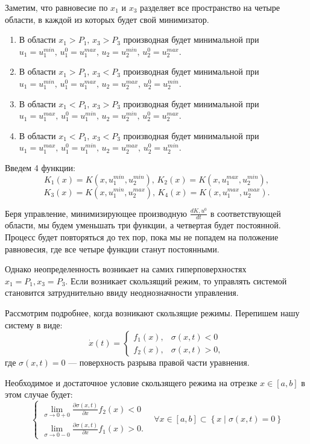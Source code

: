 \documentclass[11pt]{article}
\newcommand\Set[2]{\left\{ #1 \mid #2 \right\}}
\newcommand\dd[2]{\frac{\partial#1}{\partial#2}}
\begin{document}
Заметим, что равновесие по $x_1$ и $x_3$ разделяет все пространство на четыре области, в каждой из которых будет свой минимизатор.
\begin{enumerate}
\item
	В области $x_1 > P_1, \, x_3 > P_3$ производная будет минимальной при $u_1 = u_1^{min}, \, u_1^0 = u_1^{max}, \, u_2 = u_2^{min}, \, u_2^0 = u_2^{max}.$
\item
	В области $x_1 > P_1, \, x_3 < P_3$ производная будет минимальной при $u_1 = u_1^{min}, \, u_1^0 = u_1^{max}, \, u_2 = u_2^{max}, \, u_2^0 = u_2^{min}.$
\item
	В области $x_1 < P_1, \, x_3 > P_3$ производная будет минимальной при $u_1 = u_1^{max}, \, u_1^0 = u_1^{min}, \, u_2 = u_2^{min}, \, u_2^0 = u_2^{max}.$
\item
	В области $x_1 < P_1, \, x_3 < P_3$ производная будет минимальной при $u_1 = u_1^{max}, \, u_1^0 = u_1^{min}, \, u_2 = u_2^{max}, \, u_2^0 = u_2^{min}.$
\end{enumerate}

Введем 4 функции:
$$K_1(x) = K(x,u_1^{min}, u_2^{min}), \, K_2(x) = K(x,u_1^{max}, u_2^{min}),$$ 
$$K_3(x) = K(x,u_1^{min}, u_2^{max}), \, K_4(x) = K(x,u_1^{max}, u_2^{max}).$$

Беря управление, минимизирующее производную $\frac{dK, u^0}{dt}$ в соответствующей области, мы будем уменьшать три функции, а четвертая будет постоянной. Процесс будет повторяться до тех пор, пока мы не попадем на положение равновесия, где все четыре функции станут постоянными. 


Однако неопределенность возникает на самих гиперповерхностях $x_1 = P_1, x_3 = P_3.$ Если возникает скользящий режим, то управлять системой становится затруднительно ввиду неоднозначности управления. 

Рассмотрим подробнее, когда возникают скользящие режимы. Перепишем нашу систему в виде:
$$\dot x(t) = \begin{cases} f_1(x), & \sigma(x,t) < 0 \\ f_2(x), & \sigma(x,t) > 0,\end{cases}$$
	где $\sigma(x,t) = 0$ --- поверхность разрыва правой части уравнения.

Необходимое и достаточное условие скользящего режима на отрезке $x \in [a, b]$ в этом случае будет:
$$
\left\{
\begin{aligned}
    \lim_{\sigma \to 0+0}\dd{\sigma(x,t)}{x} f_2(x) < 0 \\
    \lim_{\sigma \to 0-0} \dd{\sigma(x,t)}{x} f_1(x) > 0.
\end{aligned}
\right.
\;\;\; \forall x \in [a, b] \subset \Set{x}{\sigma(x,t) = 0}
$$
\end{document}
